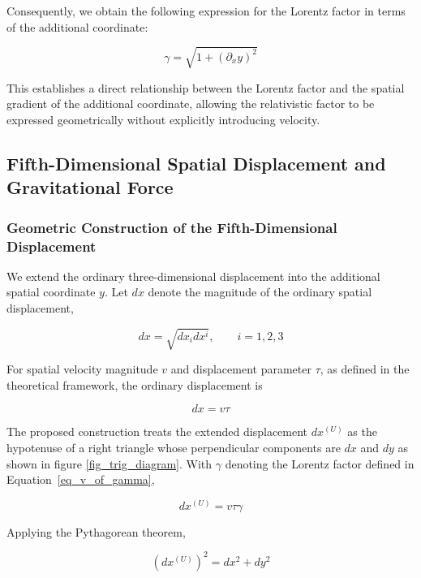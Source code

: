 \documentclass[pdflatex,sn-mathphys-num]{sn-jnl}%
\theoremstyle{thmstyleone}%
\theoremstyle{thmstyletwo}%
\theoremstyle{thmstylethree}%
\begin{document}
Consequently, we obtain the following expression for the Lorentz factor in terms of the additional coordinate:

\begin{equation}\label{eq_gamma_dy_dx}
    \boxed{
        \gamma = \sqrt{1+(\partial_x y)^2}
    }
\end{equation}

This establishes a direct relationship between the Lorentz factor and the spatial gradient of the additional coordinate, allowing the relativistic factor to be expressed geometrically without explicitly introducing velocity.


\subsection{Fifth-Dimensional Spatial Displacement and Gravitational Force}

\subsubsection{Geometric Construction of the Fifth-Dimensional Displacement}

We extend the ordinary three-dimensional displacement into the additional spatial coordinate $y$. Let $dx$ denote the magnitude of the ordinary spatial displacement, 

\begin{equation}
    dx = \sqrt{dx_i dx^i},
    \qquad i=1,2,3
\end{equation}


For spatial velocity magnitude $v$ and displacement parameter $\tau$, as defined in the theoretical framework, the ordinary displacement is

\begin{equation}
    dx = v\tau
\end{equation}

The proposed construction treats the extended displacement $dx^{(U)}$ as the hypotenuse of a right triangle whose perpendicular components are $dx$ and $dy$ as shown in figure \ref{fig_trig_diagram}. With $\gamma$ denoting the Lorentz factor defined in Equation~\ref{eq_v_of_gamma},

\begin{equation}
    dx^{(U)} = v\tau\gamma
\end{equation}

Applying the Pythagorean theorem,

\begin{equation}
    \left(dx^{(U)}\right)^2 = dx^2 + dy^2
\end{equation}
\end{document}
